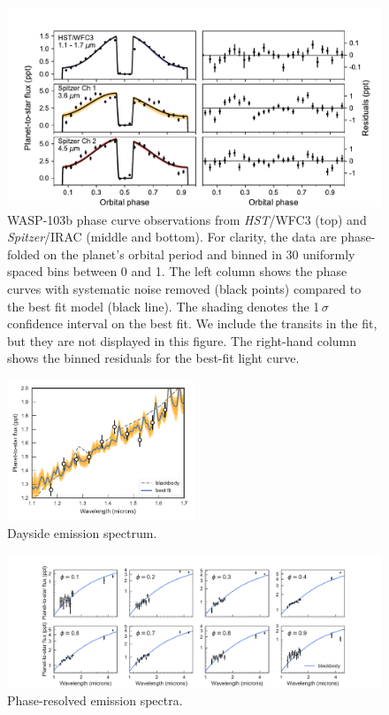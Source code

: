 \documentclass[twocolumn]{aastex61}
\newcommand{\project}[1]{\textsl{#1}}
\newcommand{\HST}{\project{HST}}
\newcommand{\Spitzer}{\project{Spitzer}}
\begin{document}
\begin{figure}
\includegraphics[width = 1.0\textwidth]{Figures/phase_curves.pdf}
\caption{WASP-103b phase curve observations from \HST/WFC3 (top) and \Spitzer/IRAC (middle and bottom). For clarity, the data are phase-folded on the planet's orbital period and binned in 30 uniformly spaced bins between 0 and 1. The left column shows the phase curves with systematic noise removed (black points) compared to the best fit model (black line). The shading denotes the  1\,$\sigma$ confidence interval on the best fit. We include the transits in the fit, but they are not displayed in this figure. The right-hand column shows the binned residuals for the best-fit light curve.}
\label{fig:phasecurves}
\end{figure}

\begin{figure}
\includegraphics[width = 0.5\textwidth]{Figures/dayside_spectrum.pdf}
\caption{Dayside emission spectrum.}
\label{fig:dayside}
\end{figure}

\begin{figure}
\includegraphics[width = 1.0\textwidth]{Figures/emission_spectra.pdf}
\caption{Phase-resolved emission spectra.}
\label{fig:spectra}
\end{figure}
\end{document}
